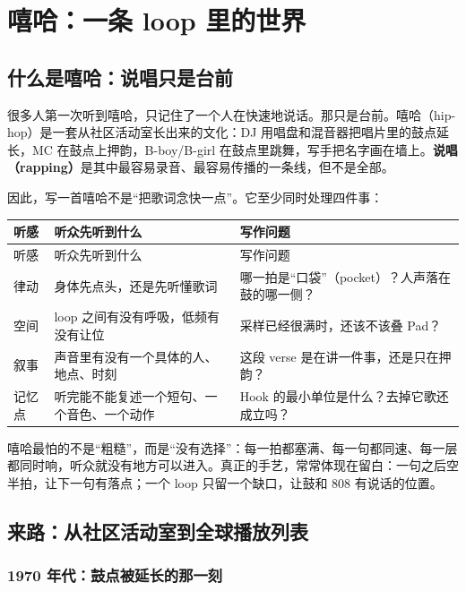 \chapter{嘻哈：一条 loop 里的世界}
\label{ch:genre-hiphop-deep}


\section{什么是嘻哈：说唱只是台前}
\label{sec:hiphop-what}

很多人第一次听到嘻哈，只记住了一个人在快速地说话。那只是台前。嘻哈（hip-hop）是一套从社区活动室长出来的文化：DJ 用唱盘和混音器把唱片里的鼓点延长，MC 在鼓点上押韵，B-boy/B-girl 在鼓点里跳舞，写手把名字画在墙上。{\bfseries 说唱（rapping）}是其中最容易录音、最容易传播的一条线，但不是全部。

因此，写一首嘻哈不是“把歌词念快一点”。它至少同时处理四件事：

\begin{longtable}{p{}p{}p{}}
\toprule
听感 & 听众先听到什么 & 写作问题 \\
\midrule
\endfirsthead
\toprule
听感 & 听众先听到什么 & 写作问题 \\
\midrule
\endhead
律动 & 身体先点头，还是先听懂歌词 & 哪一拍是“口袋”（pocket）？人声落在鼓的哪一侧？ \\
空间 & loop 之间有没有呼吸，低频有没有让位 & 采样已经很满时，还该不该叠 Pad？ \\
叙事 & 声音里有没有一个具体的人、地点、时刻 & 这段 verse 是在讲一件事，还是只在押韵？ \\
记忆点 & 听完能不能复述一个短句、一个音色、一个动作 & Hook 的最小单位是什么？去掉它歌还成立吗？ \\
\bottomrule
\end{longtable}

嘻哈最怕的不是“粗糙”，而是“没有选择”：每一拍都塞满、每一句都同速、每一层都同时响，听众就没有地方可以进入。真正的手艺，常常体现在留白：一句之后空半拍，让下一句有落点；一个 loop 只留一个缺口，让鼓和 808 有说话的位置。

\section{来路：从社区活动室到全球播放列表}
\label{sec:hiphop-history}

\subsection{1970 年代：鼓点被延长的那一刻}
\label{sec:hiphop-history-1970s}

